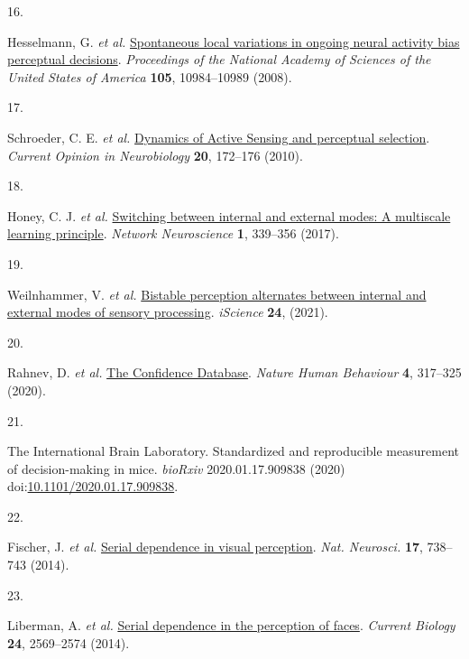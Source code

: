 \documentclass[
]{article}
\newlength{\cslhangindent}
\newlength{\csllabelwidth}
\newlength{\cslentryspacingunit} %
\newenvironment{CSLReferences}[2] %
 {%
  \setlength{\parindent}{0pt}
  \ifodd #1
  \let\oldpar\par
  \def\par{\hangindent=\cslhangindent\oldpar}
  \fi
  \setlength{\parskip}{#2\cslentryspacingunit}
 }%
 {}
\newcommand{\CSLLeftMargin}[1]{\parbox[t]{\csllabelwidth}{#1}}
\newcommand{\CSLRightInline}[1]{\parbox[t]{\linewidth - \csllabelwidth}{#1}\break}
\begin{document}
\begin{CSLReferences}{0}{0}
\leavevmode{}%
\CSLLeftMargin{16. }%
\CSLRightInline{Hesselmann, G. \emph{et al.}
\href{https://doi.org/10.1073/pnas.0712043105}{{Spontaneous local
variations in ongoing neural activity bias perceptual decisions}}.
\emph{Proceedings of the National Academy of Sciences of the United
States of America} \textbf{105}, 10984--10989 (2008).}

\leavevmode{}%
\CSLLeftMargin{17. }%
\CSLRightInline{Schroeder, C. E. \emph{et al.}
\href{https://doi.org/10.1016/j.conb.2010.02.010}{{Dynamics of Active
Sensing and perceptual selection}}. \emph{Current Opinion in
Neurobiology} \textbf{20}, 172--176 (2010).}

\leavevmode{}%
\CSLLeftMargin{18. }%
\CSLRightInline{Honey, C. J. \emph{et al.}
\href{https://doi.org/10.1162/netn_a_00024}{{Switching between internal
and external modes: A multiscale learning principle}}. \emph{Network
Neuroscience} \textbf{1}, 339--356 (2017).}

\leavevmode{}%
\CSLLeftMargin{19. }%
\CSLRightInline{Weilnhammer, V. \emph{et al.}
\href{https://doi.org/10.1016/j.isci.2021.102234}{{Bistable perception
alternates between internal and external modes of sensory processing}}.
\emph{iScience} \textbf{24}, (2021).}

\leavevmode{}%
\CSLLeftMargin{20. }%
\CSLRightInline{Rahnev, D. \emph{et al.}
\href{https://doi.org/10.1038/s41562-019-0813-1}{{The Confidence
Database}}. \emph{Nature Human Behaviour} \textbf{4}, 317--325 (2020).}

\leavevmode{}%
\CSLLeftMargin{21. }%
\CSLRightInline{The International Brain Laboratory. {Standardized and
reproducible measurement of decision-making in mice}. \emph{bioRxiv}
2020.01.17.909838 (2020)
doi:\href{https://doi.org/10.1101/2020.01.17.909838}{10.1101/2020.01.17.909838}.}

\leavevmode{}%
\CSLLeftMargin{22. }%
\CSLRightInline{Fischer, J. \emph{et al.}
\href{https://doi.org/10.1038/nn.3689}{{Serial dependence in visual
perception}}. \emph{Nat. Neurosci.} \textbf{17}, 738--743 (2014).}

\leavevmode{}%
\CSLLeftMargin{23. }%
\CSLRightInline{Liberman, A. \emph{et al.}
\href{https://doi.org/10.1016/j.cub.2014.09.025}{{Serial dependence in
the perception of faces}}. \emph{Current Biology} \textbf{24},
2569--2574 (2014).}


\end{CSLReferences}
\end{document}
